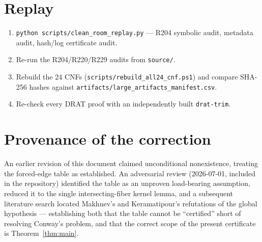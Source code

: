 \documentclass[11pt]{article}
\begin{document}
\section{Replay}

\begin{enumerate}
\item \texttt{python scripts/clean\_room\_replay.py} --- R204 symbolic audit,
metadata audit, hash/log certificate audit.
\item Re-run the R204/R220/R229 audits from \texttt{source/}.
\item Rebuild the 24 CNFs (\texttt{scripts/rebuild\_all24\_cnf.ps1}) and
compare SHA-256 hashes against
\texttt{artifacts/large\_artifacts\_manifest.csv}.
\item Re-check every DRAT proof with an independently built
\texttt{drat-trim}.
\end{enumerate}

\section{Provenance of the correction}

An earlier revision of this document claimed unconditional nonexistence,
treating the forced-edge table as established.  An adversarial review
(2026-07-01, included in the repository) identified the table as an unproven
load-bearing assumption, reduced it to the single intersecting-fiber kernel
lemma, and a subsequent literature search located Makhnev's and
Keramatipour's refutations of the global hypothesis --- establishing both
that the table cannot be ``certified'' short of resolving Conway's problem,
and that the correct scope of the present certificate is
Theorem~\ref{thm:main}.
\end{document}
